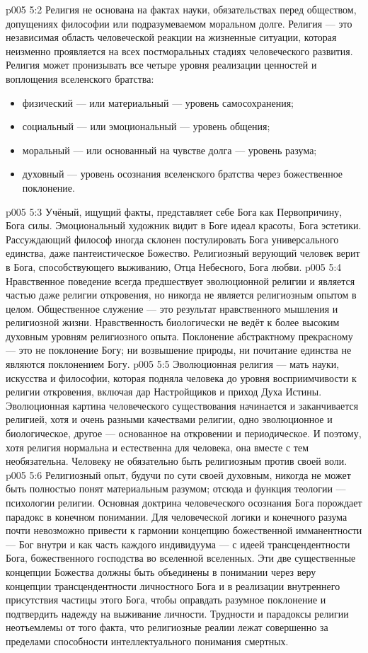 \vs p005 5:2 Религия не основана на фактах науки, обязательствах перед обществом, допущениях философии или подразумеваемом моральном долге. Религия --- это независимая область человеческой реакции на жизненные ситуации, которая неизменно проявляется на всех постморальных стадиях человеческого развития. Религия может пронизывать все четыре уровня реализации ценностей и воплощения вселенского братства: \begin{itemize}\item физический --- или материальный --- уровень самосохранения; \item социальный --- или эмоциональный --- уровень общения; \item моральный --- или основанный на чувстве долга --- уровень разума; \item духовный --- уровень осознания вселенского братства через божественное поклонение.\end{itemize}
\vs p005 5:3 Учёный, ищущий факты, представляет себе Бога как Первопричину, Бога силы. Эмоциональный художник видит в Боге идеал красоты, Бога эстетики. Рассуждающий философ иногда склонен постулировать Бога универсального единства, даже пантеистическое Божество. Религиозный верующий человек верит в Бога, способствующего выживанию, Отца Небесного, Бога любви.
\vs p005 5:4 \pc Нравственное поведение всегда предшествует эволюционной религии и является частью даже религии откровения, но никогда не является религиозным опытом в целом. Общественное служение --- это результат нравственного мышления и религиозной жизни. Нравственность биологически не ведёт к более высоким духовным уровням религиозного опыта. Поклонение абстрактному прекрасному --- это не поклонение Богу; ни возвышение природы, ни почитание единства не являются поклонением Богу.
\vs p005 5:5 Эволюционная религия --- мать науки, искусства и философии, которая подняла человека до уровня восприимчивости к религии откровения, включая дар Настройщиков и приход Духа Истины. Эволюционная картина человеческого существования начинается и заканчивается религией, хотя и очень разными качествами религии, одно эволюционное и биологическое, другое --- основанное на откровении и периодическое. И поэтому, хотя религия нормальна и естественна для человека, она вместе с тем необязательна. Человеку не обязательно быть религиозным против своей воли.
\vs p005 5:6 \pc Религиозный опыт, будучи по сути своей духовным, никогда не может быть полностью понят материальным разумом; отсюда и функция теологии --- психологии религии. Основная доктрина человеческого осознания Бога порождает парадокс в конечном понимании. Для человеческой логики и конечного разума почти невозможно привести к гармонии концепцию божественной имманентности --- Бог внутри и как часть каждого индивидуума --- с идеей трансцендентности Бога, божественного господства во вселенной вселенных. Эти две существенные концепции Божества должны быть объединены в понимании через веру концепции трансцендентности личностного Бога и в реализации внутреннего присутствия частицы этого Бога, чтобы оправдать разумное поклонение и подтвердить надежду на выживание личности. Трудности и парадоксы религии неотъемлемы от того факта, что религиозные реалии лежат совершенно за пределами способности интеллектуального понимания смертных.
